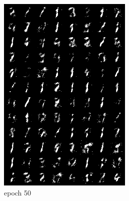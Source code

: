 \documentclass[a4paper]{article}
\theoremstyle{definition}
\newenvironment{soln}{
	\leavevmode\color{blue}\ignorespaces
}{}
\begin{document}
\begin{enumerate} [label=(\alph*)]
\begin{soln}
\begin{figure}[H]
\begin{subfigure}[b]{0.3\textwidth}
					\includegraphics[width=\textwidth]{../outputs-a200/gen_img50.png}
					\caption{epoch 50}
				\end{subfigure}
				\hfill
				\begin{subfigure}[b]{0.3\textwidth}
					\centering

\end{subfigure}
\end{figure}
\end{soln}
\end{enumerate}
\end{document}
